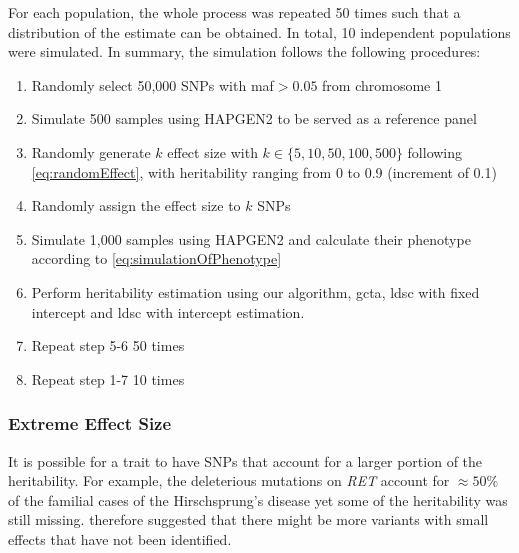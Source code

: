 			For each population, the whole process was repeated 50 times such that a distribution of the estimate can be obtained. 
			In total, 10 independent populations were simulated.
			In summary, the simulation follows the following procedures:
			\begin{enumerate}
				\item Randomly select 50,000 \glspl{SNP} with \gls{maf}$>0.05$ from chromosome 1
				\item Simulate 500 samples using HAPGEN2 to be served as a reference panel
				\item Randomly generate $k$ effect size with $k \in \{5,10,50,100,500\}$ following \cref{eq:randomEffect}, with heritability ranging from 0 to 0.9 (increment of 0.1)
				\item Randomly assign the effect size to $k$ \glspl{SNP}
				\item Simulate 1,000 samples using HAPGEN2 and calculate their phenotype according to \cref{eq:simulationOfPhenotype}
				\item Perform heritability estimation using our algorithm, \gls{gcta}, \gls{ldsc} with fixed intercept and \gls{ldsc} with intercept estimation.
				\item Repeat step 5-6 50 times
				\item Repeat step 1-7 10 times
			\end{enumerate}
		
		\subsubsection{Extreme Effect Size}
		\label{sec:extremeEffectSim}
		It is possible for a trait to have \glspl{SNP} that account for a larger portion of the heritability.
		For example, the deleterious mutations on \textit{RET} account for $\approx50\%$ of the familial cases of the Hirschsprung's disease yet some of the heritability was still missing.
		\citet{Gui2013} therefore suggested that there might be more variants with small effects that have not been identified.
		
